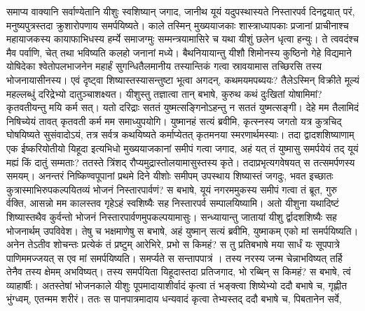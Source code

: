 \adhyAya
{}
\vakya समाप्य वाक्यानि सर्वाण्येतानि यीशुः स्वशिष्यान् जगाद,
\vakya जानीथ यूयं यदुपस्थास्यते निस्तारपर्व दिनद्वयात् परं, मनुष्यपुत्रस्तदा क्रुशारोपणाय समर्पयिष्यते।
\vakya काले तस्मिन् मुख्ययाजकाः शास्त्राध्यापकाः प्रजानां प्राचीनाश्च महायाजकस्य कायाफाभिधस्य हर्म्ये समाजग्मुः
\vakya सम्मन्त्रयामासिरे च यथा यीशुं छलेन धृत्वा हन्युः।
\vakya ते त्ववदंश्च मैव पर्वाणि, चेत् तथा भविष्यति कलहो जनानां मध्ये।
\vakya बैथनियायान्तु यीशौ शिमोनस्य कुष्ठिनो गेहे विद्यमाने
\vakya योषिदेका श्वेतोपलभाजनेन महार्हं सुगन्धितैलमानीय तस्यान्तिकं गत्वा स्रावयामास तच्छिरसि तस्य भोजनायासीनस्य।
\vakya एवं दृष्ट्वा शिष्यास्तस्यासन्तुष्टा भूत्वा अगदन्, कथमयमपब्ययः?
\vakya तैलेऽस्मिन् विक्रीते मूल्यं महल्लब्धुं दरिद्रेभ्यो दातुञ्चाशक्ष्यत।
\vakya यीशुस्तु तज्ञात्वा तान् बभाषे, कुरुथ कथं दुःखितां योषामिमां? कृतवतीयन्तु मयि कर्म सत्।
\vakya यतो दरिद्राः सततं युष्मत्सङ्गिनोऽहन्तु न सततं युष्मत्सङ्गी।
\vakya देहे मम तैलामिदं निषिच्येयं तावत् कृतवती कर्म मम समाध्युपयोगि।
\vakya युष्मानहं सत्यं ब्रवीमि, कृत्स्नस्य जगतो यत्र कुत्रचिद् घोषयिष्यते सुसंवादोऽयं, तत्र सर्वत्र कथयिष्यते कर्माप्येतत् कृतमनया स्मरणार्थमस्याः।
\vakya तदा द्वादशशिष्याणाम् एक ईष्करियोतीयो यिहूदा इत्यभिधो मुख्ययाजकानां समीपं गत्वा जगाद,
\vakya अहं यत् तं युष्मासु समर्पयेयं तद् यूयं मह्यं किं दातुं सम्मताः? ततस्ते त्रिंशद् रौप्यमुद्रास्तोलयामासुस्तस्य कृते।
\vakya तदाप्रभृत्यगवेषयत् स तत्समर्पणस्य समयम्।
\vakya अनन्तरं निष्किण्वपूपानां प्रथमे दिने यीशोः समीपम् उपस्थाय शिष्यास्तं जगदुः, भवत इच्छातः कुत्रास्माभिरुपकल्पयितव्यं भोजनं निस्तारपार्वणं?
\vakya स बभाषे, यूयं नगरममुकस्य समीपं गत्वा तं ब्रूत, गुरु र्वक्ति, आसन्नो मम कालस्तव गृहेऽहं स्वशिष्यैः सह निस्तारपर्व सम्पालयिष्यामि।
\vakya अतो यीशुना यथादिष्टं शिष्यास्तथैव कुर्वन्तो भोजनं निस्तारपार्वणमुपकल्पयामासुः।
\vakya सन्ध्यायान्तु जातायां यीशु र्द्वादशशिष्यैः सह भोजनार्थम् उपविवेश।
\vakya तेषु च भक्षमाणेषु स बभाषे, अहं युष्मान् सत्यं ब्रवीमि, युष्माकम् एको मां समर्पयिष्यति।
\vakya अनेन तेऽतीव शोचन्तः प्रत्येकं तं प्रष्टुम् आरेभिरे, प्रभो स किमहं?
\vakya स तु प्रतिबभाषे मया सार्धं यः सूपपात्रे पाणिममज्जयत् स एव मां समर्पयिष्यति। समर्प्यते स सन्तापपात्रं । तस्य नरस्य जन्म चेन्नाभविष्यत् तर्हि तेनैव तस्य क्षेमम् अभविष्यत्।
\vakya तस्य समर्पयिता यिहूदास्तदा प्रतिजगाद, भो रब्बिन् स किमहं? स बभाषे, त्वं व्याहार्षीः।
\vakya अतस्तेषां भोजनकाले यीशुः पूपमादायाशीर्वादं कृत्वा तं भङ्क्त्वा शिष्येभ्यो ददौ बभाषे च, गृह्णीत भुंग्ध्वम्, एतन्मम शरीरं।
\vakya ततः स पानपात्रमादाय धन्यवादं कृत्वा तेभ्यस्तद् ददौ बभाषे च, पिबतानेन सर्वे,
